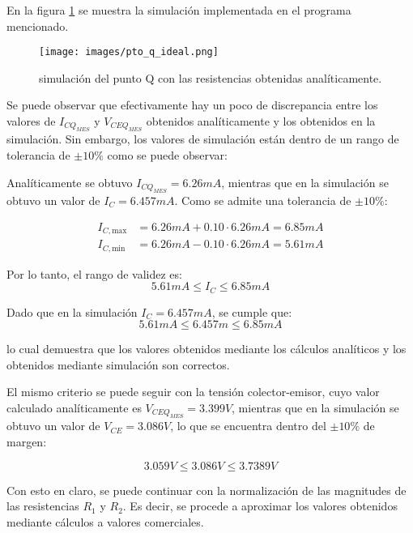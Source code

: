 En la figura \ref{fig:pto_q_ideal} se muestra la simulación implementada en el programa
mencionado.

\begin{figure}[!ht]
    \centering
    \texttt{[image: images/pto\_q\_ideal.png]}
    \caption{simulación del punto Q con las resistencias obtenidas analíticamente.}
    \label{fig:pto_q_ideal}
\end{figure}

Se puede observar que efectivamente hay un poco de discrepancia entre los valores de
$I_{CQ_{MES}}$ y $V_{CEQ_{MES}}$ obtenidos analíticamente y los obtenidos en la simulación.
Sin embargo, los valores de simulación están dentro de un rango de tolerancia de $\pm10\%$
como se puede observar:

Analíticamente se obtuvo $I_{CQ_{MES}} = 6.26mA$, mientras que en la simulación se obtuvo un valor de $I_C = 6.457mA$.
Como se admite una tolerancia de $\pm 10\%$:

\begin{align*}
I_{C,\text{max}} &= 6.26mA + 0.10 \cdot 6.26mA = 6.85mA \\[6pt]
I_{C,\text{min}} &= 6.26mA - 0.10 \cdot 6.26mA = 5.61mA
\end{align*}

Por lo tanto, el rango de validez es:
\[
5.61mA \leq I_C \leq 6.85mA
\]

Dado que en la simulación $I_C = 6.457mA$, se cumple que:
\[
5.61mA \leq 6.457m \leq 6.85mA
\]

lo cual demuestra que los valores obtenidos mediante los cálculos analíticos y los 
obtenidos mediante simulación son correctos.

El mismo criterio se puede seguir con la tensión colector-emisor, cuyo valor calculado analíticamente es
$V_{CEQ_{MES}} = 3.399V$, mientras que en la simulación se obtuvo un valor de $V_{CE} = 3.086V$, lo que se
encuentra dentro del $\pm 10\%$ de margen:

\[
3.059V \leq 3.086V \leq 3.7389V
\]

Con esto en claro, se puede continuar con la normalización de las magnitudes
de las resistencias $R_1$ y $R_2$. Es decir, se procede a aproximar los valores obtenidos 
mediante cálculos a valores comerciales.
